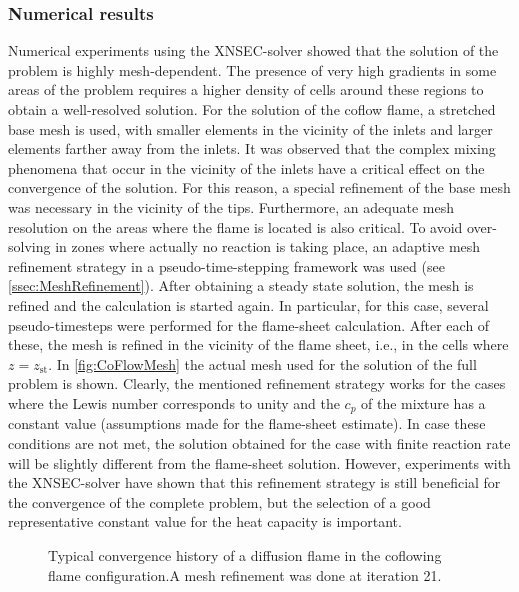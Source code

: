 \subsubsection{Numerical results}
Numerical experiments using the XNSEC-solver showed that the solution of the problem is highly mesh-dependent. The presence of very high gradients in some areas of the problem requires a higher density of cells around these regions to obtain a well-resolved solution. For the solution of the coflow flame, a stretched base mesh is used, with smaller elements in the vicinity of the inlets and larger elements farther away from the inlets. It was observed that the complex mixing phenomena that occur in the vicinity of the inlets have a critical effect on the convergence of the solution. For this reason, a special refinement of the base mesh was necessary in the vicinity of the tips. 
Furthermore, an adequate mesh resolution on the areas where the flame is located is also critical. To avoid over-solving in zones where actually no reaction is taking place, an adaptive mesh refinement strategy in a pseudo-time-stepping framework was used (see \cref{ssec:MeshRefinement}). After obtaining a steady state solution, the mesh is refined and the calculation is started again. In particular, for this case, several pseudo-timesteps were performed for the flame-sheet calculation. After each of these, the mesh is refined in the vicinity of the flame sheet, i.e., in the cells where $z = z_{\text{st}}$. In \cref{fig:CoFlowMesh} the actual mesh used for the solution of the full problem is shown. Clearly, the mentioned refinement strategy works for the cases where the Lewis number corresponds to unity and the $c_p$ of the mixture has a constant value (assumptions made for the flame-sheet estimate). In case these conditions are not met, the solution obtained for the case with finite reaction rate will be slightly different from the flame-sheet solution.  However, experiments with the XNSEC-solver have shown that this refinement strategy is still beneficial for the convergence of the complete problem, but the selection of a good representative constant value for the heat capacity is important. 
\begin{figure}[t!]
	\centering
	\caption{Typical convergence history of a diffusion flame in the coflowing flame configuration.A mesh refinement was done at iteration 21. }
	\label{fig:CoFlow_ConvergenceStory}
\end{figure}

